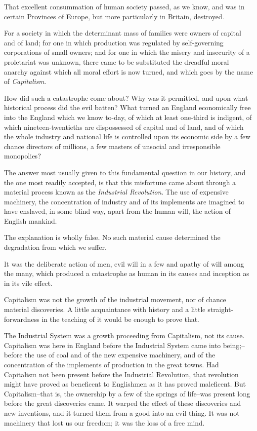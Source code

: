 \documentclass{book}
\begin{document}
That excellent consummation of human society passed, as we know, and was in certain Provinces of Europe, but more particularly in Britain, destroyed.

For a society in which the determinant mass of families were owners of capital and of land; for one in which production was regulated by self-governing corporations of small owners; and for one in which the misery and insecurity of a proletariat was unknown, there came to be substituted the dreadful moral anarchy against which all moral effort is now turned, and which goes by the name of \emph{Capitalism}.

How did such a catastrophe come about? Why was it permitted, and upon what historical process did the evil batten? What turned an England economically free into the England which we know to-day, of which at least one-third is indigent, of which nineteen-twentieths are dispossessed of capital and of land, and of which the whole industry and national life is controlled upon its economic side by a few chance directors of millions, a few masters of unsocial and irresponsible monopolies?

The answer most usually given to this fundamental question in our history, and the one most readily accepted, is that this misfortune came about through a material process known as the \emph{Industrial Revolution}. The use of expensive machinery, the concentration of industry and of its implements are imagined to have enslaved, in some blind way, apart from the human will, the action of English mankind.

The explanation is wholly false. No such material cause determined the degradation from which we suffer.

It was the deliberate action of men, evil will in a few and apathy of will among the many, which produced a catastrophe as human in its causes and inception as in its vile effect.

Capitalism was not the growth of the industrial movement, nor of chance material discoveries. A little acquaintance with history and a little straight-forwardness in the teaching of it would be enough to prove that.

The Industrial System was a growth proceeding from Capitalism, not its cause. Capitalism was here in England before the Industrial System came into being;–before the use of coal and of the new expensive machinery, and of the concentration of the implements of production in the great towns. Had Capitalism not been present before the Industrial Revolution, that revolution might have proved as beneficent to Englishmen as it has proved maleficent. But Capitalism–that is, the ownership by a few of the springs of life–was present long before the great discoveries came. It warped the effect of these discoveries and new inventions, and it turned them from a good into an evil thing. It was not machinery that lost us our freedom; it was the loss of a free mind.
\end{document}
